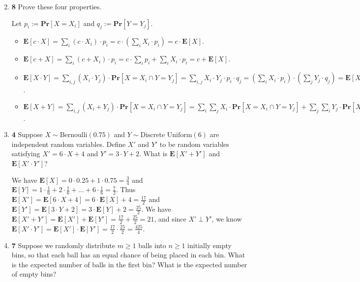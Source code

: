\documentclass[12pt]{article}
\theoremstyle{plain}
\theoremstyle{definition}
\theoremstyle{remark}
\renewcommand{\Pr}{\textbf{Pr}}
\newcommand{\E}{\textbf{E}}
\newcommand{\pts}[1]{\lbrack\textbf{#1}\rbrack}
\begin{document}
\begin{enumerate}
\setcounter{enumi}{1}

\item \pts{8} Prove these four properties.

\begin{tcolorbox}
Let $p_i:=\Pr[X=X_i]$ and $q_j:=\Pr[Y=Y_j]$.

\begin{itemize}
\item $\E[c\cdot X]=\sum_i(c\cdot X_i)\cdot p_i=c\cdot\left(\sum_iX_i\cdot p_i\right)=c\cdot\E[X]$.

\item $\E[c+X]=\sum_i(c+X_i)\cdot p_i=c\cdot\sum_ip_i+\sum_iX_i\cdot p_i=c+\E[X]$.

\item $\E[X\cdot Y]=\sum_{i,j}(X_i\cdot Y_j)\cdot\Pr[X=X_i\cap Y=Y_j]=\sum_{i,j}X_i\cdot Y_j\cdot p_i\cdot q_j=(\sum_iX_i\cdot p_i)\cdot(\sum_jY_j\cdot q_j)=\E[X]\cdot\E[Y]$.

\item $\E[X+Y]=\sum_{i,j}(X_i+Y_j)\cdot\Pr[X=X_i\cap Y=Y_j]=\sum_i\sum_jX_i\cdot\Pr[X=X_i\cap Y=Y_j]+\sum_j\sum_iY_j\cdot\Pr[X=X_i\cap Y=Y_j]=\sum_iX_i\cdot p_i+\sum_jY_j\cdot q_j=\E[X]+\E[Y]$.
\end{itemize}
\end{tcolorbox}


\item \pts{4} Suppose $X\sim\text{Bernoulli}(0.75)$ and $Y\sim\text{Discrete Uniform}(6)$ are independent random variables. Define $X'$ and $Y'$ to be random variables satisfying $X'=6\cdot X+4$ and $Y'=3\cdot Y+2$. What is $\E[X'+Y']$ and $\E[X'\cdot Y']$?

\begin{tcolorbox}
We have $\E[X]=0\cdot0.25+1\cdot0.75=\frac34$ and $\E[Y]=1\cdot\frac16+2\cdot\frac16+\dots+6\cdot\frac16=\frac72$. Thus $\E[X']=\E[6\cdot X+4]=6\cdot\E[X]+4=\frac{17}2$ and $\E[Y']=\E[3\cdot Y+2]=3\cdot\E[Y]+2=\frac{25}2$. We have $\E[X'+Y']=\E[X']+\E[Y']=\frac{17}2+\frac{25}2=21$, and since $X'\perp Y'$, we know $\E[X'\cdot Y']=\E[X']\cdot\E[Y']=\frac{17}2\cdot\frac{25}2=\frac{425}4$.
\end{tcolorbox}


\item \pts{7} Suppose we randomly distribute $m\ge1$ balls into $n\ge1$ initially empty bins, so that each ball has an equal chance of being placed in each bin. What is the expected number of balls in the first bin? What is the expected number of empty bins?


\end{enumerate}
\end{document}
